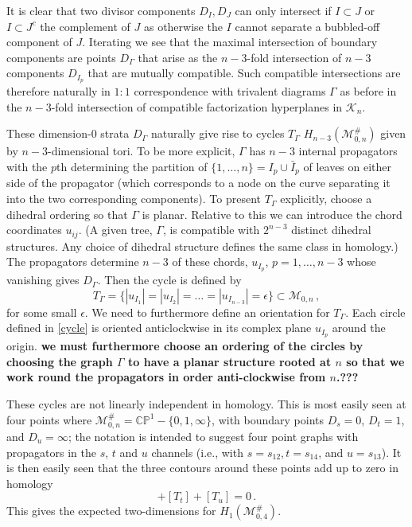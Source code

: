 \documentclass[11pt]{article}
\newcommand{\CP}{\mathbb{CP}}
\newcommand{\cK}{\mathcal{K}}
\newcommand{\cM}{\mathcal{M}}
\newcommand{\1}{{\rm 1\hskip-0.25em I}}
\begin{document}
It is clear that two divisor components $D_I, D_J$ can only intersect if $I\subset J$ or $I\subset J^c$ the complement of $J$ as otherwise the $I$ cannot separate a bubbled-off component of $J$.  Iterating we see that the maximal intersection of boundary components are points $D_\Gamma$ that arise as the $n-3$-fold intersection of $n-3$ components $D_{I_p}$ that are mutually compatible. Such compatible intersections are therefore naturally in $1:1$ correspondence with trivalent diagrams $\Gamma$ as before in the $n-3$-fold intersection of compatible factorization hyperplanes in $\cK_n$.

These dimension-0 strata $D_\Gamma$ naturally give rise to cycles $T_\Gamma$ 
$H_{n-3}(\cM_{0,n}^\#)$ given by $n-3$-dimensional tori. To be more explicit, $\Gamma$  has $n-3$ internal propagators with the $p$th determining the partition of $\{1,\ldots, n\}=I_p\cup \bar I_p$  of leaves on either side of the propagator (which corresponds to a node on the curve separating it into the two corresponding components).  To present $T_\Gamma$ explicitly, choose a dihedral ordering so that $\Gamma$ is planar.  Relative to this we can introduce the chord coordinates $u_{ij}$. (A given tree, $\Gamma$, is compatible with $2^{n-3}$ distinct dihedral structures. Any choice of dihedral structure defines the same class in homology.) The propagators determine  $n-3$ of these chords,  $u_{I_p}$, $p=1,\ldots , n-3$ whose vanishing gives $D_\Gamma$.
Then the cycle  is defined by 
\begin{equation}
T_\Gamma=\{|u_{I_1}|=|u_{I_2}|=\ldots=|u_{I_{n-3}}|=\epsilon\}\subset \cM_{0,n}\, , \label{cycle}
\end{equation}
for some small $\epsilon$.  
We need to furthermore define an orientation for $T_\Gamma$.  Each circle defined in \eqref{cycle} is oriented anticlockwise in its complex plane $u_{I_p}$ around the origin.
{\bf we must furthermore choose an ordering of the circles by choosing  the graph $\Gamma$ to have a planar structure rooted at $n$ so that we work round the propagators in order anti-clockwise from $n$.???}

These cycles are not linearly independent in homology.  This is most easily seen at four points where $\cM^\#_{0,n}=\CP^1-\{0,1,\infty\}$,
with boundary points  $D_{s}=0$, $D_{t}=1$, and $D_{u}=\infty$; the notation is intended to suggest four point graphs with propagators in the $s$, $t$ and $u$ channels (i.e., with $s=s_{12}, t=s_{14}$, and $u=s_{13}$). It is then easily seen that the three contours around these points add up to zero in homology
\begin{equation}
[T_{s}]+[T_{t}]+[T_u]=0\, .
\end{equation}
This gives the  expected two-dimensions for $H_1(\cM^\#_{0,4})$. 
\end{document}
